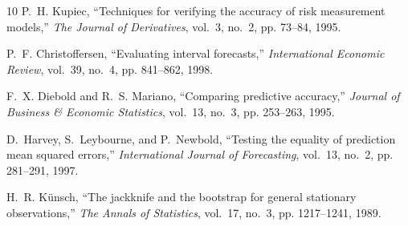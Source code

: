\documentclass[conference]{IEEEtran}
\begin{document}
\begin{thebibliography}{10}
P.~H. Kupiec, ``Techniques for verifying the accuracy of risk measurement
  models,'' \emph{The Journal of Derivatives}, vol.~3, no.~2, pp. 73--84, 1995.

P.~F. Christoffersen, ``Evaluating interval forecasts,'' \emph{International
  Economic Review}, vol.~39, no.~4, pp. 841--862, 1998.

F.~X. Diebold and R.~S. Mariano, ``Comparing predictive accuracy,''
  \emph{Journal of Business \& Economic Statistics}, vol.~13, no.~3, pp.
  253--263, 1995.

D.~Harvey, S.~Leybourne, and P.~Newbold, ``Testing the equality of prediction
  mean squared errors,'' \emph{International Journal of Forecasting}, vol.~13,
  no.~2, pp. 281--291, 1997.

H.~R. K{\"u}nsch, ``The jackknife and the bootstrap for general stationary
  observations,'' \emph{The Annals of Statistics}, vol.~17, no.~3, pp.
  1217--1241, 1989.

\end{thebibliography}
\end{document}
